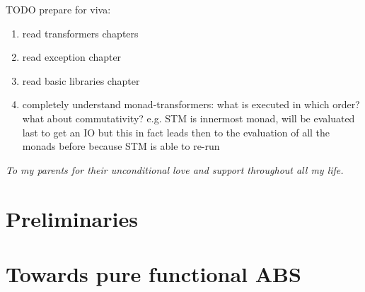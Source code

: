 \documentclass[oneside]{book}
\begin{document}
TODO prepare for viva:
\begin{enumerate}
	\item read transformers chapters
	
	\item read exception chapter

	\item read basic libraries chapter	
	
	\item completely understand monad-transformers: what is executed in which order? what about commutativity? e.g. STM is innermost monad, will be evaluated last to get an IO but this in fact leads then to the evaluation of all the monads before because STM is able to re-run
\end{enumerate}


\clearpage
\tableofcontents
\clearpage
\textit{To my parents for their unconditional love and support throughout all my life.}
\clearpage



\epigraphhead[450]{}
\part{Preliminaries}







\epigraphhead[450]{}
\part{Towards pure functional ABS}



\end{document}
